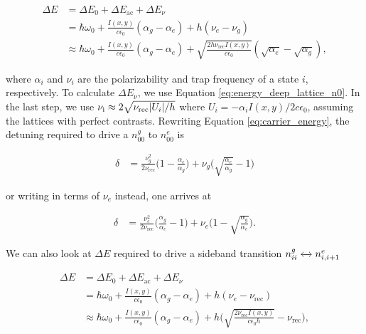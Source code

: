 \documentclass[bibnotes]{article}
\begin{document}
	\begin{align}
	\Delta E&=\Delta E_{0}+\Delta E_{\text{ac}} + \Delta E_{\nu} \nonumber\\ 
	&=\hbar\omega_0+ \frac{I(x,y)}{c\epsilon_0}(\alpha_g-\alpha_e)+h(\nu_e-\nu_g) \nonumber \nonumber\\
	&\approx\hbar\omega_0+ \frac{I(x,y)}{c\epsilon_0}(\alpha_g-\alpha_e)+
	\sqrt{\frac{2h\nu_{\text{rec}}I(x,y)}{c\epsilon_{0}}}(\sqrt{\alpha_e}-\sqrt{\alpha_g}),
	\label{eq:carrier_energy}
	\end{align}

	\noindent where $\alpha_{i}$ and $\nu_{i}$ are the polarizability and trap frequency of a state $i$, respectively. To calculate $\Delta E_{\nu}$, we use Equation \ref{eq:energy_deep_lattice_n0}. In the last step, we use $\nu_{\text{i}}\approx 2\sqrt{\nu_{\text{rec}}\abs{U_{i}}/h}$ where $U_{i}=-\alpha_{i}I(x,y)/2c\epsilon_0$, assuming the lattices with perfect contrasts. Rewriting Equation \ref{eq:carrier_energy}, the detuning required to drive a $n^{g}_{00}$ to $n^{e}_{00}$ is 


	\begin{align}
	\delta&=\frac{\nu^{2}_g}{2\nu_{\text{rec}}}\bigg(1-\frac{\alpha_e}{\alpha_g}\bigg) + \nu_g\bigg(\sqrt{\frac{\alpha_e}{\alpha_g}}-1\bigg)
	\label{eq:carrier_freq_vg}
	\end{align}

	\noindent or writing in terms of $\nu_e$ instead, one arrives at 

	\begin{align}
	\delta&=\frac{\nu^{2}_e}{2\nu_{\text{rec}}}\bigg(\frac{\alpha_g}{\alpha_e}-1\bigg) + \nu_e\bigg(1-\sqrt{\frac{\alpha_g}{\alpha_e}}\bigg).
	\label{eq:carrier_freq_ve}
	\end{align}


	\noindent We can also look at $\Delta E$ required to drive a sideband transition $n^{g}_{ii} \xleftrightarrow{} n^{e}_{i,i+1}$


	\begin{align}
	\Delta E&=\Delta E_{0}+\Delta E_{\text{ac}} + \Delta E_{\nu} \nonumber \\ 
	&=\hbar\omega_0+ \frac{I(x,y)}{c\epsilon_0}(\alpha_g-\alpha_e)+h(\nu_e-\nu_{\text{rec}}) \nonumber \\
	&\approx\hbar\omega_0+ \frac{I(x,y)}{c\epsilon_0}(\alpha_g-\alpha_e)+h\bigg(\sqrt{\frac{2\nu_{\text{rec}}I(x,y)}{c\epsilon_0 h}}-\nu_{\text{rec}}\bigg),
	\end{align}
\end{document}

